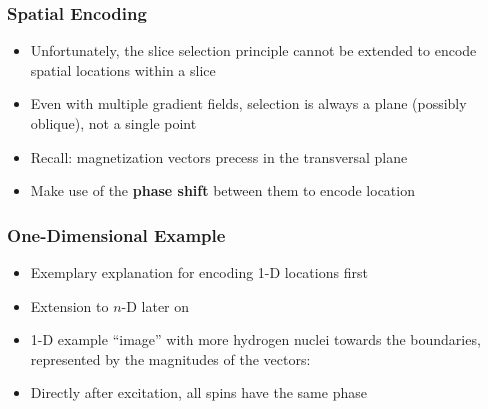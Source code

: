 \begin{frame}
	\frametitle{Spatial Encoding}
	
	\begin{itemize}
		\item Unfortunately, the slice selection principle cannot be extended to encode spatial locations within a slice
		\item Even with multiple gradient fields, selection is always a plane (possibly oblique), not a single point
		
		\vspace{2ex}
		
		\item Recall: magnetization vectors precess in the transversal plane
		\item Make use of the \textbf{phase shift} between them to encode location
		
		\begin{center}
		\end{center}
	\end{itemize}
\end{frame}

\begin{frame}
	\frametitle{One-Dimensional Example}
	
	\begin{itemize}
		\item Exemplary explanation for encoding 1-D locations first
		\item Extension to $n$-D later on
		\item 1-D example ``image'' with more hydrogen nuclei towards the boundaries, represented by the magnitudes of the vectors:
	\end{itemize}
	
	\begin{center}
		\begingroup
		
		\endgroup
	\end{center}
	
	\begin{itemize}
		\item Directly after excitation, all spins have the same phase
	\end{itemize}
\end{frame}

